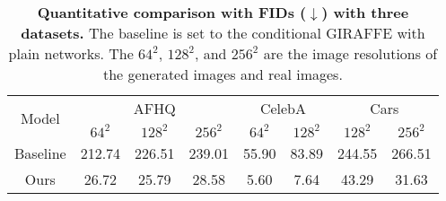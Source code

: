 \documentclass[nohyperref]{article}
\theoremstyle{plain}
\theoremstyle{definition}
\theoremstyle{remark}
\begin{document}
\begin{table}[h!]
\caption{\textbf{Quantitative comparison with FIDs ($\downarrow$) with three datasets.} The baseline is set to the conditional GIRAFFE with plain networks. The $64^{2}$, $128^{2}$, and $256^{2}$ are the image resolutions of the generated images and real images.}
\label{table_1}
\vskip 0.15in
\begin{center}
\begin{small}
\begin{sc}
\resizebox{\columnwidth}{!}
{
\begin{tabular}{c|ccc|cc|cc}
\hline\hline
\multirow{2}{*}{Model} & \multicolumn{3}{c|}{AFHQ} & \multicolumn{2}{c|}{CelebA} & \multicolumn{2}{c}{Cars}\\
\cline{2-8}
      & $64^{2}$ & $128^{2}$ & $256^{2}$ & $64^{2}$ & $128^{2}$ & $128^{2}$ & $256^{2}$ \\
\hline
 Baseline & 212.74 & 226.51 & 239.01 & 55.90 & 83.89 & 244.55 & 266.51 \\
 Ours & 26.72 & 25.79 & 28.58 & 5.60 & 7.64 &43.29 & 31.63 \\
 
\hline
\hline
\end{tabular}}
\end{sc}
\end{small}
\end{center}
\vskip -0.1in
\end{table}
\end{document}
